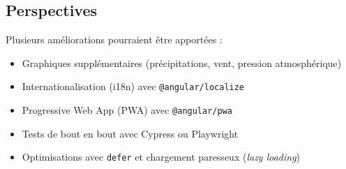 \documentclass[12pt,a4paper]{article}
\begin{document}
\subsection{Perspectives}

Plusieurs améliorations pourraient être apportées :
\begin{itemize}[nosep]
    \item Graphiques supplémentaires (précipitations, vent, pression atmosphérique)
    \item Internationalisation (i18n) avec \texttt{@angular/localize}
    \item Progressive Web App (PWA) avec \texttt{@angular/pwa}
    \item Tests de bout en bout avec Cypress ou Playwright
    \item Optimisations avec \texttt{defer} et chargement paresseux (\emph{lazy loading})
\end{itemize}
\end{document}
